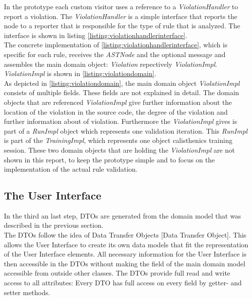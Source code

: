 In the prototype each custom visitor uses a reference to a \textit{ViolationHandler} to report a violation. The \textit{ViolationHandler} is a simple interface that reports the node to a reporter that is responsible for the type of rule that is analyzed. The interface is shown in listing \ref{listing:violationhandlerinterface}. 
\\

The concrete implementation of \ref{listing:violationhandlerinterface}, which is specific for each rule, receives the \textit{ASTNode} and the optional message and assembles the main domain object: \textit{Violation} repectively \textit{ViolationImpl}. \textit{ViolationImpl} is shown in \ref{listing:violationdomain}.
\\

As depicted in \ref{listing:violationdomain}, the main domain object \textit{ViolationImpl} consists of multiple fields. These fields are not explained in detail. The domain objects that are referenced \textit{ViolationImpl} give further information about the location of the violation in the source code, the degree of the violation and further information about of violation. Furthermore the \textit{ViolationImpl} gives is part of a \textit{RunImpl} object which represents one validation iteration. This \textit{RunImpl} is part of the \textit{TrainingImpl}, which represents one object calisthenics training session. These two domain objects that are holding the \textit{ViolationImpl} are not shown in this report, to keep the prototype simple and to focus on the implementation of the actual rule validation. 
\\

\subsection{The User Interface}
In the third an last step, \ac{DTO}s are generated from the domain model that was described in the previous section. 
\\

The \ac{DTO}s follow the idea of Data Transfer Objects \cite{wiki}[Data Transfer Object]. This allows the User Interface to create its own data models that fit the representation of the User Interface elements. All necessary information for the User Interface is then accessible in the \ac{DTO}s without making the field of the main domain model accessible from outside other classes. The \ac{DTO}s provide full read and write access to all attributes: Every \ac{DTO} has full access on every field by getter- and setter methods. 
\\

